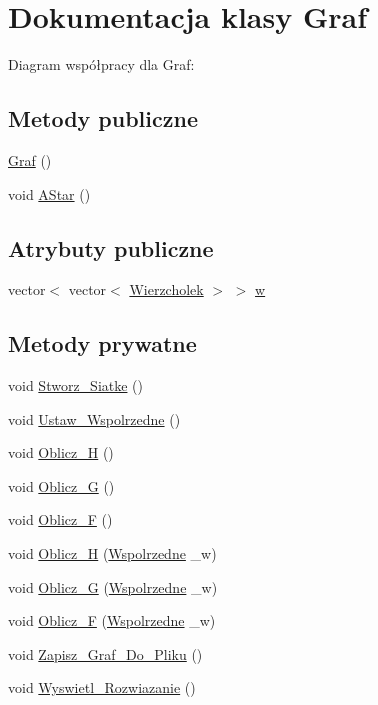 \hypertarget{class_graf}{\section{\-Dokumentacja klasy \-Graf}
\label{class_graf}
}


\-Diagram współpracy dla \-Graf\-:
\subsection*{\-Metody publiczne}
\begin{DoxyCompactItemize}
\item 
\hyperlink{class_graf_a05a504069321858769df57555045d808}{\-Graf} ()
\item 
void \hyperlink{class_graf_ae29b8306166b7a81b2724cb7959883bf}{\-A\-Star} ()
\end{DoxyCompactItemize}
\subsection*{\-Atrybuty publiczne}
\begin{DoxyCompactItemize}
\item 
vector$<$ vector$<$ \hyperlink{struct_wierzcholek}{\-Wierzcholek} $>$ $>$ \hyperlink{class_graf_a735e94e0248b6cc21ff6766369f23d7f}{w}
\end{DoxyCompactItemize}
\subsection*{\-Metody prywatne}
\begin{DoxyCompactItemize}
\item 
void \hyperlink{class_graf_a58d43194a95c49a2132d037d2a83714e}{\-Stworz\-\_\-\-Siatke} ()
\item 
void \hyperlink{class_graf_aeaedcc5c95ab356ed279a3d022a328a3}{\-Ustaw\-\_\-\-Wspolrzedne} ()
\item 
void \hyperlink{class_graf_a54b3f23c0da32fa746e6b991d987bf14}{\-Oblicz\-\_\-\-H} ()
\item 
void \hyperlink{class_graf_a1d71b0030082e1ed99276ea518d5867a}{\-Oblicz\-\_\-\-G} ()
\item 
void \hyperlink{class_graf_a272156ba0b40ce841d21d6e3871a47cb}{\-Oblicz\-\_\-\-F} ()
\item 
void \hyperlink{class_graf_a818a19c813f0a45546c358fceef4dd75}{\-Oblicz\-\_\-\-H} (\hyperlink{struct_wspolrzedne}{\-Wspolrzedne} \-\_\-w)
\item 
void \hyperlink{class_graf_af297ae5bd3d0622add85e00fc746cdad}{\-Oblicz\-\_\-\-G} (\hyperlink{struct_wspolrzedne}{\-Wspolrzedne} \-\_\-w)
\item 
void \hyperlink{class_graf_a1d7648e65898a7f44c66441083317232}{\-Oblicz\-\_\-\-F} (\hyperlink{struct_wspolrzedne}{\-Wspolrzedne} \-\_\-w)
\item 
void \hyperlink{class_graf_a98ad839ecc5724d26565296dfb27aeed}{\-Zapisz\-\_\-\-Graf\-\_\-\-Do\-\_\-\-Pliku} ()
\item 
void \hyperlink{class_graf_ae344019ceba0448c2b32cfe5fa448788}{\-Wyswietl\-\_\-\-Rozwiazanie} ()
\end{DoxyCompactItemize}
